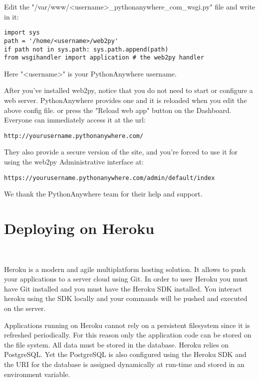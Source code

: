 \documentclass[justified,sixbynine,notoc]{tufte-book}
\def\inxx#1{\index{#1}}
\begin{document}
\begin{fullwidth}
Edit the "/var/www/<username>\_pythonanywhere\_com\_wsgi.py" file and write in it:

\begin{lstlisting}
import sys
path = '/home/<username>/web2py'
if path not in sys.path: sys.path.append(path)
from wsgihandler import application # the web2py handler
\end{lstlisting}

Here "<username>" is your PythonAnywhere username.

After you've installed web2py, notice that you do not need to start or configure a web server. PythonAnywhere provides one and it is reloaded when you edit the above config file.
or press the "Reload web app" button on the Dashboard. Everyone can immediately access it at the url:

\begin{lstlisting}[keywords={}]
http://yourusername.pythonanywhere.com/
\end{lstlisting}

They also provide a secure version of the site, and you're forced to use it for using the web2py Administrative interface at:

\begin{lstlisting}[keywords={}]
https://yourusername.pythonanywhere.com/admin/default/index
\end{lstlisting}

We thank the PythonAnywhere team for their help and support.

\goodbreak\section{Deploying on Heroku}

~\cite{heroku} \inxx{Heroku}

Heroku is a modern and agile multiplatform hosting solution. It allows to push your applications to a server cloud using Git. In order to user Heroku you must have Git installed and you must have the Heroku SDK installed. You interact heroku using the SDK locally and your commands will be pushed and executed on the server.

Applications running on Heroku cannot rely on a persistent filesystem since it is refreshed periodically. For this reason only the application code can be stored on the file system. All data must be stored in the database. Heroku relies on PostgreSQL. Yet the PostgreSQL is also configured using the Heroku SDK and the URI for the database is assigned dynamically at run-time and stored in an environment variable.


\end{fullwidth}
\end{document}
